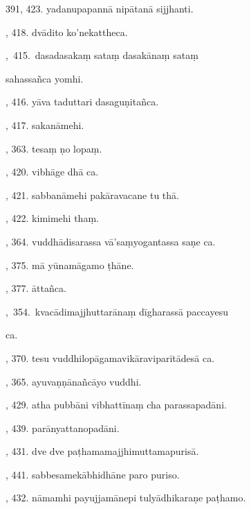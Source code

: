 391, 423. yadanupapannā nipātanā sijjhanti.\hfill \pageref{sut:391}\par {}, 418. dvādito ko’nekattheca.\hfill \pageref{sut:392}\par {},~415.~dasadasakaṃ sataṃ dasakānaṃ sataṃ\par \noindent
\hspace{15mm} sahassañca yomhi.\hfill \pageref{sut:393}\par {}, 416. yāva taduttari dasaguṇitañca.\hfill \pageref{sut:394}\par {}, 417. sakanāmehi.\hfill \pageref{sut:395}\par {}, 363. tesaṃ ṇo lopaṃ.\hfill \pageref{sut:396}\par {}, 420. vibhāge dhā ca.\hfill \pageref{sut:397}\par {}, 421. sabbanāmehi pakāravacane tu thā.\hfill \pageref{sut:398}\par {}, 422. kimimehi thaṃ.\hfill \pageref{sut:399}\par {}, 364. vuddhādisarassa vā’saṃyogantassa saṇe ca.\hfill \pageref{sut:400}\par {}, 375. mā yūnamāgamo ṭhāne.\hfill \pageref{sut:401}\par {}, 377. āttañca.\hfill \pageref{sut:402}\par {},~354.~kvacādimajjhuttarānaṃ dīgharassā paccayesu\par \noindent
\hspace{15mm} ca.\hfill \pageref{sut:403}\par {}, 370. tesu vuddhilopāgamavikāraviparītādesā ca.\hfill \pageref{sut:404}\par {}, 365. ayuvaṇṇānañcāyo vuddhi.\hfill \pageref{sut:405}\par {}, 429. atha pubbāni vibhattīnaṃ cha parassapadāni.\hfill \pageref{sut:406}\par {}, 439. parānyattanopadāni.\hfill \pageref{sut:407}\par {}, 431. dve dve paṭhamamajjhimuttamapurisā.\hfill \pageref{sut:408}\par {}, 441. sabbesamekābhidhāne paro puriso.\hfill \pageref{sut:409}\par {}, 432. nāmamhi payujjamānepi tulyādhikaraṇe paṭhamo.\par \noindent
\hspace{15mm}\hfill \pageref{sut:410}\par \noindent
